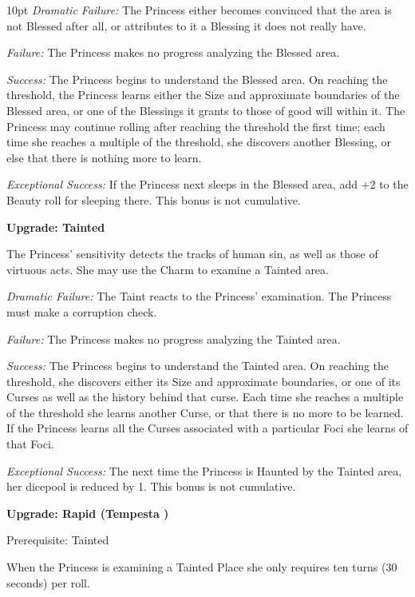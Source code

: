   \begin{myindentpar}{10pt}  \emph{Dramatic Failure:} The Princess either becomes convinced that the area is not Blessed after all, or attributes to it a Blessing it does not really have. 

    \emph{Failure:} The Princess makes no progress analyzing the Blessed area. 

    \emph{Success:} The Princess begins to understand the Blessed area. On reaching the threshold, the Princess learns either the Size and approximate boundaries of the Blessed area, or one of the Blessings it grants to those of good will within it. The Princess may continue rolling after reaching the threshold the first time; each time she reaches a multiple of the threshold, she discovers another Blessing, or else that there is nothing more to learn. 

    \emph{Exceptional Success:} If the Princess next sleeps in the Blessed area, add +2 to the Beauty roll for sleeping there. This bonus is not cumulative. 

    \textbf{Upgrade: Tainted}
    
    The Princess' sensitivity detects the tracks of human sin, as well as those of virtuous acts. She may use the Charm to examine a Tainted area.

    \emph{Dramatic Failure:} The Taint reacts to the Princess' examination. The Princess must make a corruption check. 

    \emph{Failure:} The Princess makes no progress analyzing the Tainted area. 

    \emph{Success:} The Princess begins to understand the Tainted area. On reaching the threshold, she discovers either its Size and approximate boundaries, or one of its Curses as well as the history behind that curse. Each time she reaches a multiple of the threshold she learns another Curse, or that there is no more to be learned. If the Princess learns all the Curses associated with a particular Foci she learns of that Foci.

    \emph{Exceptional Success:} The next time the Princess is Haunted by the Tainted area, her dicepool is reduced by 1. This bonus is not cumulative. 
	
	\textbf{Upgrade: Rapid (Tempesta \textbullet)}
	
	Prerequisite: Tainted
	
	When the Princess is examining a Tainted Place she only requires ten turns (30 seconds) per roll.
	
\end{myindentpar}
